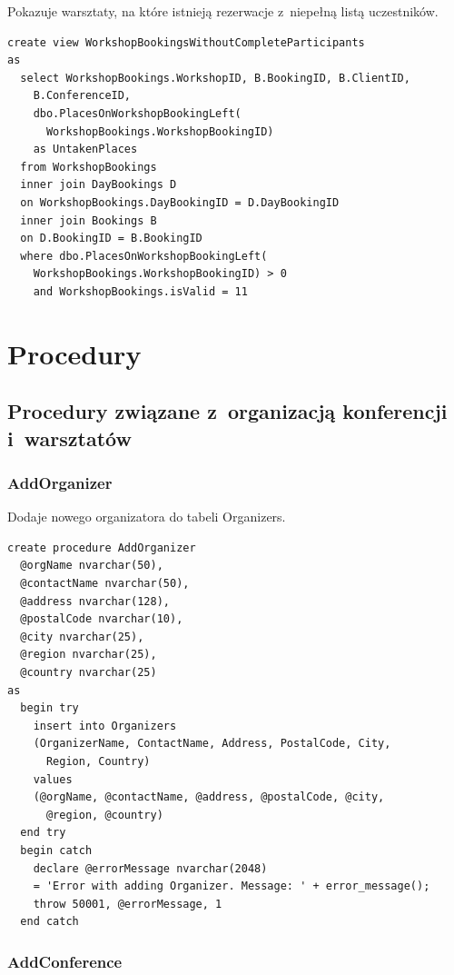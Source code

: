 \documentclass[12pt, a4paper]{mwrep}
\begin{document}
\noindent Pokazuje warsztaty, na które istnieją rezerwacje z~niepełną listą uczestników.

\begin{lstlisting}
create view WorkshopBookingsWithoutCompleteParticipants
as
  select WorkshopBookings.WorkshopID, B.BookingID, B.ClientID, 
    B.ConferenceID, 
    dbo.PlacesOnWorkshopBookingLeft(
      WorkshopBookings.WorkshopBookingID) 
    as UntakenPlaces
  from WorkshopBookings
  inner join DayBookings D 
  on WorkshopBookings.DayBookingID = D.DayBookingID
  inner join Bookings B 
  on D.BookingID = B.BookingID
  where dbo.PlacesOnWorkshopBookingLeft(
    WorkshopBookings.WorkshopBookingID) > 0 
    and WorkshopBookings.isValid = 11
\end{lstlisting}

\chapter{Procedury}

\section{Procedury związane z~organizacją konferencji i~warsztatów}

\subsection{AddOrganizer}

\noindent Dodaje nowego organizatora do tabeli Organizers.

\begin{lstlisting}
create procedure AddOrganizer
  @orgName nvarchar(50),
  @contactName nvarchar(50),
  @address nvarchar(128),
  @postalCode nvarchar(10),
  @city nvarchar(25),
  @region nvarchar(25),
  @country nvarchar(25)
as
  begin try
    insert into Organizers
    (OrganizerName, ContactName, Address, PostalCode, City, 
      Region, Country)
    values
    (@orgName, @contactName, @address, @postalCode, @city, 
      @region, @country)
  end try
  begin catch
    declare @errorMessage nvarchar(2048)
    = 'Error with adding Organizer. Message: ' + error_message();
    throw 50001, @errorMessage, 1
  end catch
\end{lstlisting}

\subsection{AddConference}
\end{document}
